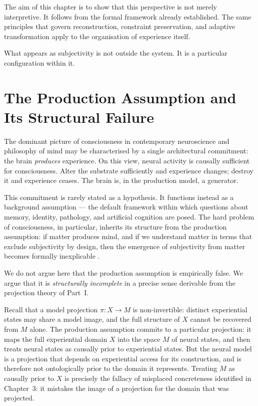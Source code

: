 \documentclass[11pt,openany]{book}
\begin{document}
The aim of this chapter is to show that this perspective is not merely interpretive. It follows from the formal framework already established. The same principles that govern reconstruction, constraint preservation, and adaptive transformation apply to the organisation of experience itself.

What appears as subjectivity is not outside the system. It is a particular configuration within it.

\section{The Production Assumption and Its Structural Failure}
\label{sec:production-assumption}

The dominant picture of consciousness in contemporary
neuroscience and philosophy of mind may be characterised by
a single architectural commitment: the brain \emph{produces}
experience.  On this view, neural activity is causally
sufficient for consciousness.  Alter the substrate
sufficiently and experience changes; destroy it and
experience ceases.  The brain is, in the production model,
a generator.

This commitment is rarely stated as a hypothesis.  It
functions instead as a background assumption --- the default
framework within which questions about memory, identity,
pathology, and artificial cognition are posed.  The hard
problem of consciousness, in particular, inherits its
structure from the production assumption: if matter produces
mind, and if we understand matter in terms that exclude
subjectivity by design, then the emergence of subjectivity
from matter becomes formally inexplicable
\citep{chalmers1996conscious}.

We do not argue here that the production assumption is
empirically false.  We argue that it is \emph{structurally
incomplete} in a precise sense derivable from the projection
theory of Part~I.

Recall that a model projection $\pi : X \to M$ is
non-invertible: distinct experiential states may share a
model image, and the full structure of $X$ cannot be
recovered from $M$ alone.  The production assumption
commits to a particular projection: it maps the full
experiential domain $X$ into the space $M$ of neural
states, and then treats neural states as causally prior to
experiential states.  But the neural model is a projection
that depends on experiential access for its construction,
and is therefore not ontologically prior to the domain it
represents.  Treating $M$ as causally prior to $X$ is
precisely the fallacy of misplaced concreteness identified
in Chapter~3: it mistakes the image of a projection for
the domain that was projected.
\end{document}
